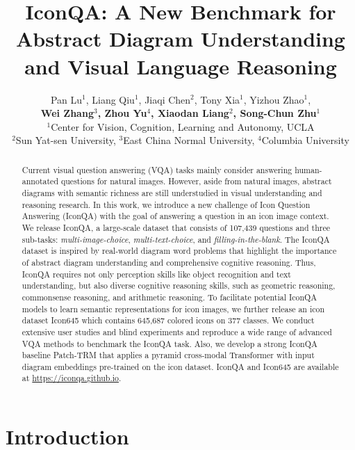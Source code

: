 \documentclass{article}
\title{IconQA: A New Benchmark for Abstract Diagram Understanding and Visual Language Reasoning}
\author{Pan Lu$^{1}$, Liang Qiu$^{1}$, Jiaqi Chen$^2$, Tony Xia$^{1}$, Yizhou Zhao$^{1}$,  \\\textbf{ Wei Zhang$^3$, Zhou Yu$^4$, Xiaodan Liang$^2$, Song-Chun Zhu$^{1}$} \\
  $^1$Center for Vision, Cognition, Learning and Autonomy, UCLA \\
  $^2$Sun Yat-sen University, $^3$East China Normal University, 
  $^4$Columbia University
}
\begin{document}
\maketitle

\vspace{-2mm}
\begin{abstract}
Current visual question answering (VQA) tasks mainly consider answering human-annotated questions for natural images. However, aside from natural images, abstract diagrams with semantic richness are still understudied in visual understanding and reasoning research. In this work, we introduce a new challenge of Icon Question Answering (IconQA) with the goal of answering a question in an icon image context. We release IconQA, a large-scale dataset that consists of 107,439 questions and three sub-tasks: \textit{multi-image-choice}, \textit{multi-text-choice}, and \textit{filling-in-the-blank}. The IconQA dataset is inspired by real-world diagram word problems that highlight the importance of abstract diagram understanding and comprehensive cognitive reasoning. Thus, IconQA requires not only perception skills like object recognition and text understanding, but also diverse cognitive reasoning skills, such as geometric reasoning, commonsense reasoning, and arithmetic reasoning. To facilitate potential IconQA models to learn semantic representations for icon images, we further release an icon dataset Icon645 which contains 645,687 colored icons on 377 classes. We conduct extensive user studies and blind experiments and reproduce a wide range of advanced VQA methods to benchmark the IconQA task. Also, we develop a strong IconQA baseline Patch-TRM that applies a pyramid cross-modal Transformer with input diagram embeddings pre-trained on the icon dataset. IconQA and Icon645 are available at \url{https://iconqa.github.io}.

\end{abstract}

\vspace{-2mm}

\section{Introduction}
\end{document}
